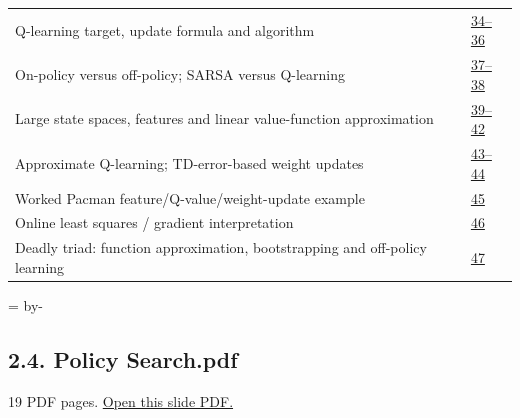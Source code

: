\documentclass[10pt]{article}
\newcommand{\deckheading}[1]{\par\begingroup\skip0=\pagegoal\advance\skip0 by-\pagetotal\ifdim\skip0<7\baselineskip\newpage\fi\endgroup\subsection{#1}}
\begin{document}
\begin{longtable}{@{}P{.79\linewidth}P{.17\linewidth}@{}}
Q-learning target, update formula and algorithm & \href{../Lecture\%20Slides/2.3.\%20Q-learning.pdf\#page=34}{34--36}\\[3pt]
On-policy versus off-policy; SARSA versus Q-learning & \href{../Lecture\%20Slides/2.3.\%20Q-learning.pdf\#page=37}{37--38}\\[3pt]
Large state spaces, features and linear value-function approximation & \href{../Lecture\%20Slides/2.3.\%20Q-learning.pdf\#page=39}{39--42}\\[3pt]
Approximate Q-learning; TD-error-based weight updates & \href{../Lecture\%20Slides/2.3.\%20Q-learning.pdf\#page=43}{43--44}\\[3pt]
Worked Pacman feature/Q-value/weight-update example & \href{../Lecture\%20Slides/2.3.\%20Q-learning.pdf\#page=45}{45}\\[3pt]
Online least squares / gradient interpretation & \href{../Lecture\%20Slides/2.3.\%20Q-learning.pdf\#page=46}{46}\\[3pt]
Deadly triad: function approximation, bootstrapping and off-policy learning & \href{../Lecture\%20Slides/2.3.\%20Q-learning.pdf\#page=47}{47}\\[3pt]
\bottomrule\end{longtable}
\deckheading{2.4. Policy Search.pdf}
{\small 19 PDF pages. \href{../Lecture\%20Slides/2.4.\%20Policy\%20Search.pdf}{Open this slide PDF.}}\par
\end{document}
